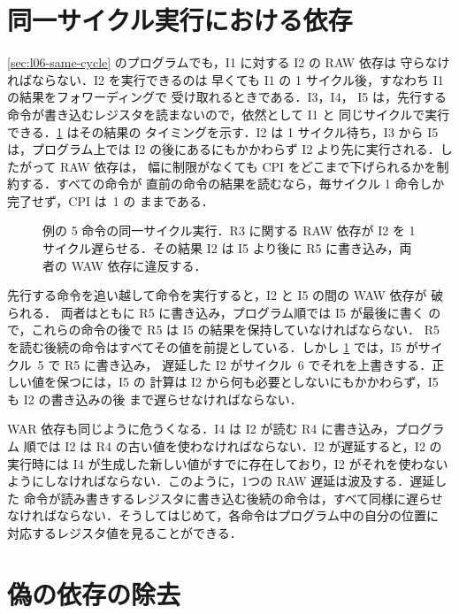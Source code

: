 \documentclass[../main.tex]{subfiles}
\begin{document}
\section{同一サイクル実行における依存}
\label{sec:l06-dependences}

\cref{sec:l06-same-cycle} のプログラムでも，I1 に対する I2 の RAW 依存は
守らなければならない．I2 を実行できるのは
早くても I1 の 1 サイクル後，すなわち I1 の結果をフォワーディングで
受け取れるときである．I3，I4，
I5 は，先行する命令が書き込むレジスタを読まないので，依然として I1 と
同じサイクルで実行できる．\cref{fig:l06-dependences} はその結果の
タイミングを示す．I2 は 1 サイクル待ち，I3 から I5 は，プログラム上では
I2 の後にあるにもかかわらず I2 より先に実行される．したがって RAW 依存は，
幅に制限がなくても CPI をどこまで下げられるかを制約する．すべての命令が
直前の命令の結果を読むなら，毎サイクル 1 命令しか完了せず，CPI は~1 の
ままである．

\begin{figure}[htbp]
  \centering
  
  \caption{例の 5 命令の同一サイクル実行．R3 に関する RAW 依存が I2 を
    1 サイクル遅らせる．その結果 I2 は I5 より後に R5 に書き込み，両者の
    WAW 依存に違反する．}
  \label{fig:l06-dependences}
\end{figure}

先行する命令を追い越して命令を実行すると，I2 と I5 の間の WAW 依存が
破られる．%
両者はともに R5 に書き込み，プログラム順では I5 が最後に書く
ので，これらの命令の後で R5 は I5 の結果を保持していなければならない．
R5 を読む後続の命令はすべてその値を前提としている．しかし
\cref{fig:l06-dependences} では，I5 がサイクル~5 で R5 に書き込み，
遅延した I2 がサイクル~6 でそれを上書きする．正しい値を保つには，I5 の
計算は I2 から何も必要としないにもかかわらず，I5 も I2 の書き込みの後
まで遅らせなければならない．

WAR 依存も同じように危うくなる．I4 は I2 が読む R4 に書き込み，プログラム
順では I2 は R4 の古い値を使わなければならない．I2 が遅延すると，I2 の
実行時には I4 が生成した新しい値がすでに存在しており，I2 がそれを使わない
ようにしなければならない．このように，1つの RAW 遅延は波及する．遅延した
命令が読み書きするレジスタに書き込む後続の命令は，すべて同様に遅らせ
なければならない．そうしてはじめて，各命令はプログラム中の自分の位置に
対応するレジスタ値を見ることができる．

\section{偽の依存の除去}
\label{sec:l06-false}
\end{document}

